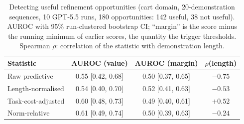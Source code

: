 \begin{table}[t]
\centering\small
\caption{Detecting useful refinement opportunities (cart domain, 20-demonstration sequences, 10 GPT-5.5 runs,
180 opportunities: 142 useful, 38 not useful). AUROC with 95\% run-clustered bootstrap CI; ``margin'' is the score
minus the running minimum of earlier scores, the quantity the trigger thresholds. Spearman $\rho$: correlation of the
statistic with demonstration length.}
\label{tab:trigger-auroc}
\begin{tabular}{lccc}
\toprule
Statistic & AUROC (value) & AUROC (margin) & $\rho$(length) \\
\midrule
Raw predictive & 0.55 [0.42, 0.68] & 0.50 [0.37, 0.65] & $-0.75$ \\
Length-normalised & 0.54 [0.40, 0.70] & 0.52 [0.41, 0.63] & $-0.53$ \\
Task-cost-adjusted & 0.60 [0.48, 0.73] & 0.49 [0.40, 0.61] & $+0.52$ \\
Norm-relative & 0.61 [0.49, 0.74] & 0.50 [0.39, 0.63] & $-0.24$ \\
\bottomrule
\end{tabular}
\end{table}
